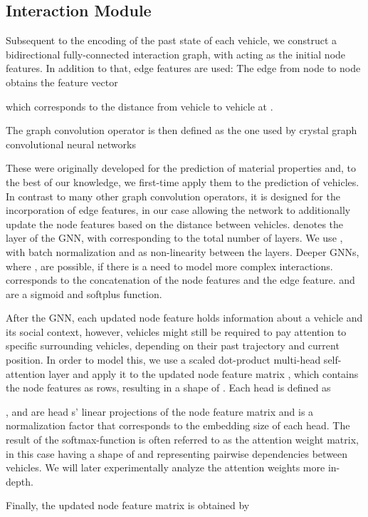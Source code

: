 \documentclass[letterpaper, 10 pt, conference]{ieeeconf}
\begin{document}
\subsection{Interaction Module}
Subsequent to the encoding of the past state of each vehicle, we construct a bidirectional fully-connected interaction graph, with  acting as the initial node features.
In addition to that, edge features are used:
The edge from node  to node  obtains the feature vector

which corresponds to the distance from vehicle  to vehicle  at .

The graph convolution operator is then defined as the one used by crystal graph convolutional neural networks \cite{Xie2018}

These were originally developed for the prediction of material properties and, to the best of our knowledge, we first-time apply them to the prediction of vehicles.
In contrast to many other graph convolution operators, it is designed for the incorporation of edge features, in our case allowing the network to additionally update the node features based on the distance between vehicles.
 denotes the layer of the GNN, with  corresponding to the total number of layers.
We use , with batch normalization and  as non-linearity between the layers.
Deeper GNNs, where , are possible, if there is a need to model more complex interactions.
 corresponds to the concatenation of the node features and the edge feature.  and  are a sigmoid and softplus function.

After the GNN, each updated node feature  holds information about a vehicle and its social context, however, vehicles might still be required to pay attention to specific surrounding vehicles, depending on their past trajectory and current position.
In order to model this, we use a scaled dot-product multi-head self-attention layer \cite{Vaswani2017} and apply it to the updated node feature matrix , which contains the node features  as rows, resulting in a shape of .
Each head  is defined as

,  and  are head s' linear projections of the node feature matrix  and  is a normalization factor that corresponds to the embedding size of each head.
The result of the softmax-function is often referred to as the attention weight matrix, in this case having a shape of  and representing pairwise dependencies between vehicles.
We will later experimentally analyze the attention weights more in-depth.

Finally, the updated node feature matrix  is obtained by
\end{document}

